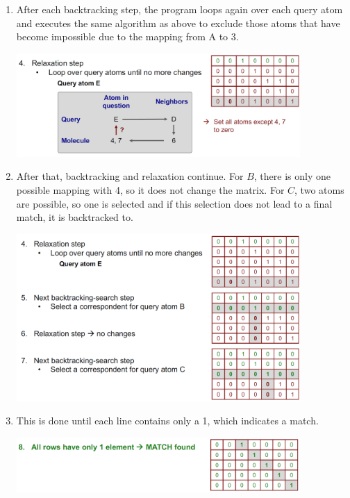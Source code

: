 \begin{enumerate}
    \item After each backtracking step, the program loops again over each query atom and executes the same algorithm as above to exclude those atoms that have become impossible due to the mapping from A to 3.
    \begin{center}\includegraphics[width=0.85\textwidth]{img/cheminformatics/UllmannBacktrackingAr.png}\end{center}
    \item After that, backtracking and relaxation continue. For $B$, there is only one possible mapping with 4, so it does not change the matrix. For $C$, two atoms are possible, so one is selected and if this selection does not lead to a final match, it is backtracked to.
    \begin{center}\includegraphics[width=0.85\textwidth]{img/cheminformatics/UllmannBacktrackingB.png}\end{center}
    \item This is done until each line contains only a 1, which indicates a match.
    \begin{center}\includegraphics[width=0.85\textwidth]{img/cheminformatics/UllmannBacktrackingC.png}\end{center}
\end{enumerate}

